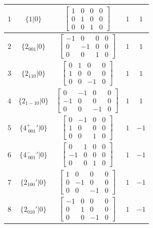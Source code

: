 \documentclass[fleqn,8pt]{jsarticle}
\begin{document}
\begin{longtable}{ccccc}
$ 1 $ & $ \{1|0\} $ & $ \begin{bmatrix} 1 & 0 & 0 & 0 \\ 0 & 1 & 0 & 0 \\ 0 & 0 & 1 & 0 \end{bmatrix} $ & $ 1 $ & $ 1 $ \\ \hline
$ 2 $ & $ \{2{}_{001}|0\} $ & $ \begin{bmatrix} -1 & 0 & 0 & 0 \\ 0 & -1 & 0 & 0 \\ 0 & 0 & 1 & 0 \end{bmatrix} $ & $ 1 $ & $ 1 $ \\ \hline
$ 3 $ & $ \{2{}_{110}|0\} $ & $ \begin{bmatrix} 0 & 1 & 0 & 0 \\ 1 & 0 & 0 & 0 \\ 0 & 0 & -1 & 0 \end{bmatrix} $ & $ 1 $ & $ 1 $ \\ \hline
$ 4 $ & $ \{2{}_{1-10}|0\} $ & $ \begin{bmatrix} 0 & -1 & 0 & 0 \\ -1 & 0 & 0 & 0 \\ 0 & 0 & -1 & 0 \end{bmatrix} $ & $ 1 $ & $ 1 $ \\ \hline
$ 5 $ & $ \{4^{+}_{\,\,001}{}'|0\} $ & $ \begin{bmatrix} 0 & -1 & 0 & 0 \\ 1 & 0 & 0 & 0 \\ 0 & 0 & 1 & 0 \end{bmatrix} $ & $ 1 $ & $ -1 $ \\ \hline
$ 6 $ & $ \{4^{-}_{\,\,001}{}'|0\} $ & $ \begin{bmatrix} 0 & 1 & 0 & 0 \\ -1 & 0 & 0 & 0 \\ 0 & 0 & 1 & 0 \end{bmatrix} $ & $ 1 $ & $ -1 $ \\ \hline
$ 7 $ & $ \{2{}_{100}{}'|0\} $ & $ \begin{bmatrix} 1 & 0 & 0 & 0 \\ 0 & -1 & 0 & 0 \\ 0 & 0 & -1 & 0 \end{bmatrix} $ & $ 1 $ & $ -1 $ \\ \hline
$ 8 $ & $ \{2{}_{010}{}'|0\} $ & $ \begin{bmatrix} -1 & 0 & 0 & 0 \\ 0 & 1 & 0 & 0 \\ 0 & 0 & -1 & 0 \end{bmatrix} $ & $ 1 $ & $ -1 $ \\ \hline

\end{longtable}
\end{document}
